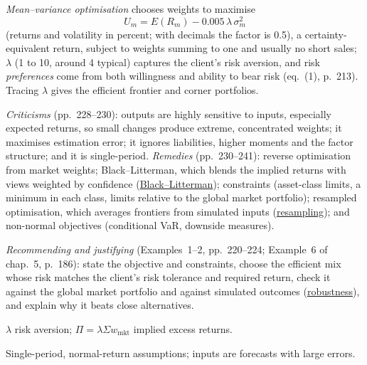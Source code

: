 \begin{qfmethod}\label{meth:asset-only-allocation-mvo}
 \emph{Mean--variance optimisation} \citep[chap.~6, sec.~2, pp.~213--241]{portfolio-management-in-practice-v1-2020} chooses weights to maximise
\[
U_m=E(R_m)-0.005\,\lambda\,\sigma_m^2
\]
(returns and volatility in percent; with decimals the factor is 0.5), a certainty-equivalent return, subject to weights summing to one and usually no short sales; $\lambda$ (1 to 10, around 4 typical) captures the client's risk aversion, and risk \emph{preferences} come from both willingness and ability to bear risk (eq.~(1), p.~213). Tracing $\lambda$ gives the efficient frontier and corner portfolios.

\emph{Criticisms} (pp.~228--230): outputs are highly sensitive to inputs, especially expected returns, so small changes produce extreme, concentrated weights; it maximises estimation error; it ignores liabilities, higher moments and the factor structure; and it is single-period. \emph{Remedies} (pp.~230--241): reverse optimisation from market weights; Black--Litterman, which blends the implied returns with views weighted by confidence (\hyperref[mod:black-litterman]{Black--Litterman}); constraints (asset-class limits, a minimum in each class, limits relative to the global market portfolio); resampled optimisation, which averages frontiers from simulated inputs (\hyperref[meth:resampled-efficiency]{resampling}); and non-normal objectives (conditional VaR, downside measures).

\emph{Recommending and justifying} (Examples~1--2, pp.~220--224; Example~6 of chap.~5, p.~186): state the objective and constraints, choose the efficient mix whose risk matches the client's risk tolerance and required return, check it against the global market portfolio and against simulated outcomes (\hyperref[meth:allocation-robustness-liquidity-risk-budget]{robustness}), and explain why it beats close alternatives.

 $\lambda$ risk aversion; $\Pi=\lambda\Sigma w_{\text{mkt}}$ implied excess returns.

 Single-period, normal-return assumptions; inputs are forecasts with large errors.


\end{qfmethod}
